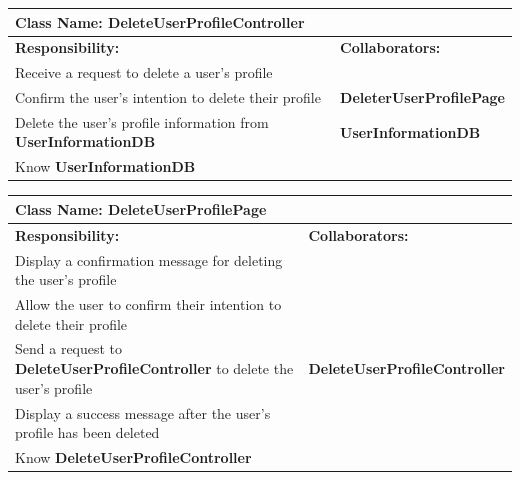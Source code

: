 \documentclass[]{article}
\begin{document}
\begin{table}[H]
        \centering
        \begin{tabular}{|p{5cm}|p{5cm}|}
        \hline 
         \multicolumn{2}{|l|}{\textbf{Class Name:} DeleteUserProfileController} \\
        \hline
        \textbf{Responsibility:} & \textbf{Collaborators:} \\
        \hline
        Receive a request to delete a user's profile & \phantom{} \\
        \hline
        Confirm the user's intention to delete their profile & \textbf{DeleterUserProfilePage}\\
        \hline
        Delete the user's profile information from \textbf{UserInformationDB} & \textbf{UserInformationDB} \\
        \hline
         Know \textbf{UserInformationDB} & \phantom{} \\
        \hline
        
        \end{tabular}
    \end{table}

\begin{table}[H]
        \centering
        \begin{tabular}{|p{5cm}|p{5cm}|}
        \hline 
         \multicolumn{2}{|l|}{\textbf{Class Name:} DeleteUserProfilePage} \\
        \hline
        \textbf{Responsibility:} & \textbf{Collaborators:} \\
        \hline
       Display a confirmation message for deleting the user's profile & \phantom{} \\
        \hline
        Allow the user to confirm their intention to delete their profile & \phantom{} \\
        \hline
        Send a request to \textbf{DeleteUserProfileController} to delete the user's profile & \textbf{DeleteUserProfileController} \\
        \hline
        Display a success message after the user's profile has been deleted & \phantom{} \\
        \hline
        Know \textbf{DeleteUserProfileController} & \phantom{} \\
        \hline
        
        \end{tabular}
    \end{table}
\end{document}
